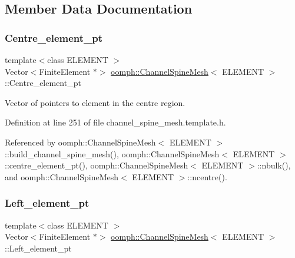 \subsection{Member Data Documentation}
\mbox{\label{classoomph_1_1ChannelSpineMesh_aef52a18c46a4ec6121a129789d46db3e}} 
\subsubsection{\texorpdfstring{Centre\+\_\+element\+\_\+pt}{Centre\_element\_pt}}
{\footnotesize\ttfamily template$<$class E\+L\+E\+M\+E\+NT $>$ \\
Vector$<$Finite\+Element $\ast$$>$ \hyperlink{classoomph_1_1ChannelSpineMesh}{oomph\+::\+Channel\+Spine\+Mesh}$<$ E\+L\+E\+M\+E\+NT $>$\+::Centre\+\_\+element\+\_\+pt\hspace{0.3cm}{\ttfamily [protected]}}



Vector of pointers to element in the centre region. 



Definition at line 251 of file channel\+\_\+spine\+\_\+mesh.\+template.\+h.



Referenced by oomph\+::\+Channel\+Spine\+Mesh$<$ E\+L\+E\+M\+E\+N\+T $>$\+::build\+\_\+channel\+\_\+spine\+\_\+mesh(), oomph\+::\+Channel\+Spine\+Mesh$<$ E\+L\+E\+M\+E\+N\+T $>$\+::centre\+\_\+element\+\_\+pt(), oomph\+::\+Channel\+Spine\+Mesh$<$ E\+L\+E\+M\+E\+N\+T $>$\+::nbulk(), and oomph\+::\+Channel\+Spine\+Mesh$<$ E\+L\+E\+M\+E\+N\+T $>$\+::ncentre().

\mbox{\label{classoomph_1_1ChannelSpineMesh_aaa8df0751eebdab02466afa0253dedbd}} 
\subsubsection{\texorpdfstring{Left\+\_\+element\+\_\+pt}{Left\_element\_pt}}
{\footnotesize\ttfamily template$<$class E\+L\+E\+M\+E\+NT $>$ \\
Vector$<$Finite\+Element $\ast$$>$ \hyperlink{classoomph_1_1ChannelSpineMesh}{oomph\+::\+Channel\+Spine\+Mesh}$<$ E\+L\+E\+M\+E\+NT $>$\+::Left\+\_\+element\+\_\+pt\hspace{0.3cm}{\ttfamily [protected]}}



